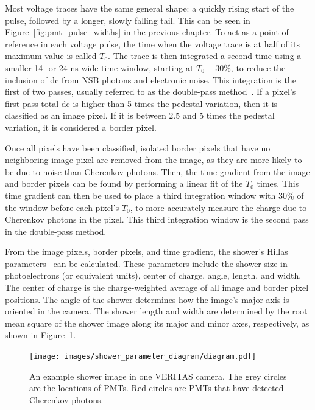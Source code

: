 Most voltage traces have the same general shape: a quickly rising start of the pulse, followed by a longer, slowly falling tail.
This can be seen in Figure~\ref{fig:pmt_pulse_widths} in the previous chapter.
To act as a point of reference in each voltage pulse, the time when the voltage trace is at half of its maximum value is called $T_{0}$.
The trace is then integrated a second time using a smaller 14- or 24-ns-wide time window, starting at $T_0 - 30\%$, to reduce the inclusion of dc from NSB photons and electronic noise.
This integration is the first of two passes, usually referred to as the double-pass method~\cite{doublepass}.
If a pixel's first-pass total dc is higher than 5 times the pedestal variation, then it is classified as an image pixel.
If it is between 2.5 and 5 times the pedestal variation, it is considered a border pixel.

Once all pixels have been classified, isolated border pixels that have no neighboring image pixel are removed from the image, as they are more likely to be due to noise than Cherenkov photons.
Then, the time gradient from the image and border pixels can be found by performing a linear fit of the $T_{0}$ times.
This time gradient can then be used to place a third integration window 
with 30\% of the window before each pixel's $T_{0}$, to more accurately measure the charge due to Cherenkov photons in the pixel.
This third integration window is the second pass in the double-pass method.

From the image pixels, border pixels, and time gradient, the shower's Hillas parameters~\cite{hillas_params} can be calculated.
These parameters include the shower size in photoelectrons (or equivalent units), center of charge, angle, length, and width.
The center of charge is the charge-weighted average of all image and border pixel positions.
The angle of the shower determines how the image's major axis is oriented in the camera.
The shower length and width are determined by the root mean square of the shower image along its major and minor axes, respectively, as shown in Figure~\ref{fig:shower_param}.
  
\begin{figure}[t]
  \centering
  \texttt{[image: images/shower\_parameter\_diagram/diagram.pdf]}
  \caption[Basic Shower Diagram]{
    An example shower image in one VERITAS camera.
    The grey circles are the locations of PMTs.
    Red circles are PMTs that have detected Cherenkov photons.
  }
  \label{fig:shower_param}
\end{figure}
\FloatBarrier


